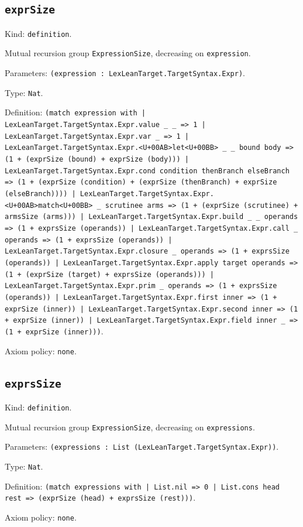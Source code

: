 \documentclass[11pt]{article}
\begin{document}
\subsection*{\texttt{exprSize}}
\noindent Kind: \texttt{definition}.\par
\noindent Mutual recursion group \texttt{ExpressionSize}, decreasing on \texttt{expression}.\par
\noindent Parameters: \texttt{(expression : LexLeanTarget.TargetSyntax.Expr)}.\par
\noindent Type: \texttt{Nat}.\par
\noindent Definition: \texttt{(match expression with | LexLeanTarget.TargetSyntax.Expr.value \_ \_ => 1 | LexLeanTarget.TargetSyntax.Expr.var \_ => 1 | LexLeanTarget.TargetSyntax.Expr.<U+00AB>let<U+00BB> \_ \_ bound body => (1 + (exprSize (bound) + exprSize (body))) | LexLeanTarget.TargetSyntax.Expr.cond condition thenBranch elseBranch => (1 + (exprSize (condition) + (exprSize (thenBranch) + exprSize (elseBranch)))) | LexLeanTarget.TargetSyntax.Expr.<U+00AB>match<U+00BB> \_ scrutinee arms => (1 + (exprSize (scrutinee) + armsSize (arms))) | LexLeanTarget.TargetSyntax.Expr.build \_ \_ operands => (1 + exprsSize (operands)) | LexLeanTarget.TargetSyntax.Expr.call \_ operands => (1 + exprsSize (operands)) | LexLeanTarget.TargetSyntax.Expr.closure \_ operands => (1 + exprsSize (operands)) | LexLeanTarget.TargetSyntax.Expr.apply target operands => (1 + (exprSize (target) + exprsSize (operands))) | LexLeanTarget.TargetSyntax.Expr.prim \_ operands => (1 + exprsSize (operands)) | LexLeanTarget.TargetSyntax.Expr.first inner => (1 + exprSize (inner)) | LexLeanTarget.TargetSyntax.Expr.second inner => (1 + exprSize (inner)) | LexLeanTarget.TargetSyntax.Expr.field inner \_ => (1 + exprSize (inner)))}.\par
\noindent Axiom policy: \texttt{none}.\par
\subsection*{\texttt{exprsSize}}
\noindent Kind: \texttt{definition}.\par
\noindent Mutual recursion group \texttt{ExpressionSize}, decreasing on \texttt{expressions}.\par
\noindent Parameters: \texttt{(expressions : List (LexLeanTarget.TargetSyntax.Expr))}.\par
\noindent Type: \texttt{Nat}.\par
\noindent Definition: \texttt{(match expressions with | List.nil => 0 | List.cons head rest => (exprSize (head) + exprsSize (rest)))}.\par
\noindent Axiom policy: \texttt{none}.\par
\end{document}
